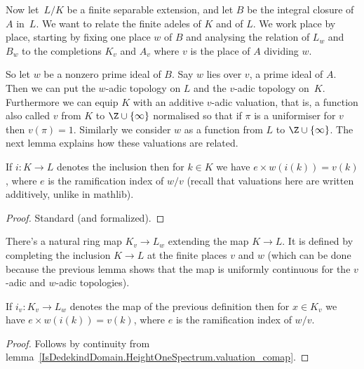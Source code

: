 Now let~$L/K$ be a finite separable extension, and let $B$ be the integral closure of~$A$ in~$L$.
We want to relate the finite adeles of $K$ and of $L$. We work place by place, starting by fixing
one place $w$ of $B$ and analysing the relation of $L_w$ and $B_w$ to the completions $K_v$
and $A_v$ where $v$ is the place of $A$ dividing $w$.

So let $w$ be a nonzero prime ideal of $B$. Say $w$ lies over $v$, a prime ideal of $A$.
Then we can put the $w$-adic topology on $L$ and the $v$-adic topology on~$K$. Furthermore
we can equip $K$ with an additive $v$-adic valuation, that is,
a function also called $v$ from $K$ to $\Z\cup\{\infty\}$ normalised so that if $\pi$ is a uniformiser
for $v$ then $v(\pi)=1$. Similarly we consider $w$ as a function from $L$ to $\Z\cup\{\infty\}$.
The next lemma explains how these valuations are related.

\begin{lemma}
  \label{IsDedekindDomain.HeightOneSpectrum.valuation_comap}
  \leanok
  If $i:K\to L$ denotes the inclusion then for $k\in K$ we have
  $e\times w(i(k))=v(k)$, where $e$ is the ramification index of $w/v$
  (recall that valuations here are written additively, unlike in mathlib).
\end{lemma}
\begin{proof}
  \leanok
  Standard (and formalized).
\end{proof}

\begin{definition}
  \label{IsDedekindDomain.HeightOneSpectrum.adicCompletionComapSemialgHom}
  \leanok
  There's a natural ring map $K_v\to L_w$ extending the map $K\to L$.
  It is defined by completing
  the inclusion $K\to L$ at the finite places $v$ and $w$ (which can be done
  because the previous lemma shows that the map is uniformly continuous for the $v$-adic
  and $w$-adic topologies).
\end{definition}

\begin{lemma}
  \label{IsDedekindDomain.HeightOneSpectrum.valued_adicCompletionComap}
  \leanok
  If $i_v:K_v\to L_w$ denotes the map of the previous definition
  then for $x\in K_v$ we have
  $e\times w(i(k))=v(k)$, where $e$ is the ramification index of $w/v$.
\end{lemma}
\begin{proof}
  \leanok
  Follows by continuity from lemma~\ref{IsDedekindDomain.HeightOneSpectrum.valuation_comap}.
\end{proof}

